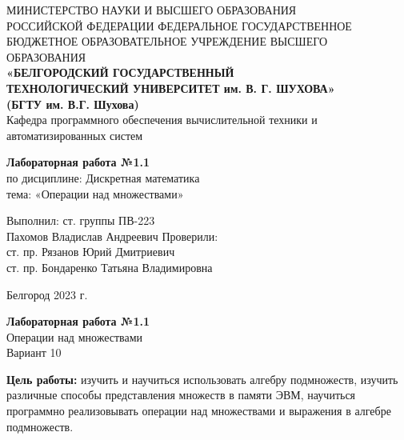 \documentclass[a4paper,14pt]{extarticle}
\newcommand\textbox[1]{
	\parbox{.45\textwidth}{#1}
}
\begin{document}
	
	\begin{center}
		\small{
			МИНИСТЕРСТВО НАУКИ И ВЫСШЕГО ОБРАЗОВАНИЯ \\РОССИЙСКОЙ ФЕДЕРАЦИИ
			\bigbreak
			ФЕДЕРАЛЬНОЕ ГОСУДАРСТВЕННОЕ БЮДЖЕТНОЕ ОБРАЗОВАТЕЛЬНОЕ УЧРЕЖДЕНИЕ ВЫСШЕГО ОБРАЗОВАНИЯ \\
			\bigbreak
			\textbf{«БЕЛГОРОДСКИЙ ГОСУДАРСТВЕННЫЙ \\ТЕХНОЛОГИЧЕСКИЙ УНИВЕРСИТЕТ им. В. Г. ШУХОВА»\\ (БГТУ им. В.Г. Шухова)} \\
			\bigbreak
			Кафедра программного обеспечения вычислительной техники и автоматизированных систем\\}
	\end{center}
	
	\vfill
	\begin{center}
		\large{
			\textbf{
				Лабораторная работа №1.1 }}\\
		\normalsize{
			по дисциплине: Дискретная математика \\
			тема: «Операции над множествами»}
	\end{center}
	\vfill
	\hfill\textbox{
		Выполнил: ст. группы ПВ-223\\Пахомов Владислав Андреевич
		\bigbreak
		Проверили: \\ст. пр. Рязанов Юрий Дмитриевич\\
		ст. пр. Бондаренко Татьяна Владимировна
	}
	\vfill\begin{center}
		Белгород 2023 г.
	\end{center}
	\newpage
	\begin{center}
		\textbf{Лабораторная работа №1.1}\\
		Операции над множествами\\
		Вариант 10
	\end{center}
    \textbf{Цель работы: }изучить и научиться использовать алгебру подмножеств, изучить различные способы представления множеств в памяти ЭВМ, научиться программно реализовывать операции над множествами и выражения в алгебре подмножеств.
\end{document}
